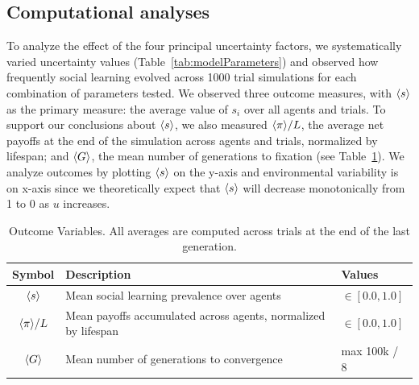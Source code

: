 \documentclass[letterpaper,11.5pt]{scrartcl}
\begin{document}
\subsection{Computational analyses}
\label{ssec:computationalAnalyses}


To analyze the effect of the four principal uncertainty factors, we systematically
varied uncertainty values (Table~\ref{tab:modelParameters}) and observed how frequently social learning evolved across
1000 trial simulations for each combination of parameters tested. %
We observed three outcome measures, with $\langle s \rangle$ as the primary measure: the average value of $s_i$ over all agents and trials. To support our conclusions
about $\langle s \rangle$, we also measured $\langle \pi \rangle / L$, the average net  payoffs at the end of the simulation across agents and trials, normalized by lifespan; 
and $\langle G \rangle$, the mean
number of generations to fixation (see Table~\ref{tab:outcomeVariables}). We analyze outcomes by plotting $\langle s \rangle$ on the y-axis and environmental variability is on x-axis since we
theoretically expect that $\langle s \rangle$ will decrease monotonically from 1 to 0 as $u$
increases. %

\begin{table}[h]
    \caption{Outcome Variables. All averages are computed across trials at the end of the last generation.}
    \label{tab:outcomeVariables}
    \centering %
    \begin{tabular}{cp{4.25in}p{0.85in}} \toprule

        Symbol & Description & Values \\ 

        \midrule  

        $\langle s \rangle$ & Mean social learning prevalence over agents
                  & $\in [0.0, 1.0]$ \\

        $\langle \pi \rangle / L$ & Mean payoffs accumulated across agents, normalized by
        lifespan & $\in [0.0, 1.0]$ \\

        $\langle G \rangle$ & Mean number of generations to convergence & max 100k / 8 \\
        \bottomrule
    \end{tabular}
\end{table}
\end{document}
